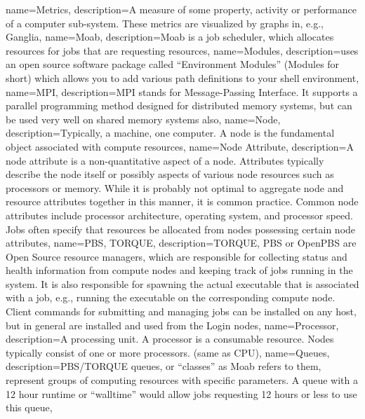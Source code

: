 {
  name={Metrics},
  description={A measure of some property, activity or performance of a computer sub-system. These metrics are visualized by graphs in, e.g., Ganglia},
}
{
  name={Moab},
  description={Moab is a job scheduler, which allocates resources for jobs that are requesting resources},
}
{
  name={Modules},
  description={\hpc uses an open source software package called ``Environment Modules'' (Modules for short) which allows you to add various path definitions to your shell environment},
}
{
  name={MPI},
  description={MPI stands for Message-Passing Interface. It supports a parallel programming method designed for distributed memory systems, but can be used very well on shared memory systems also},
}
{
  name={Node},
  description={Typically, a machine, one computer. A node is the fundamental object associated with compute resources},
}
{
  name={Node Attribute},
  description={A node attribute is a non-quantitative aspect of a node. Attributes typically describe the node itself or possibly aspects of various node resources such as processors or memory. While it is probably not optimal to aggregate node and resource attributes together in this manner, it is common practice. Common node attributes include processor architecture, operating system, and processor speed. Jobs often specify that resources be allocated from nodes possessing certain node attributes},
}
{
  name={PBS, TORQUE},
  description={TORQUE, PBS or OpenPBS are Open Source resource managers, which are responsible for collecting status and health information from compute nodes and keeping track of jobs running in the system. It is also responsible for spawning the actual executable that is associated with a job, e.g., running the executable on the corresponding compute node. Client commands for submitting and managing jobs can be installed on any host, but in general are installed and used from the Login nodes},
}
{
  name={Processor},
  description={A processing unit. A processor is a consumable resource. Nodes typically consist of one or more processors. (same as CPU)},
}
{
  name={Queues},
  description={PBS/TORQUE queues, or ``classes'' as Moab refers to them, represent groups of computing resources with specific parameters. A queue with a 12 hour runtime or ``walltime'' would allow jobs requesting 12 hours or less to use this queue},
}
